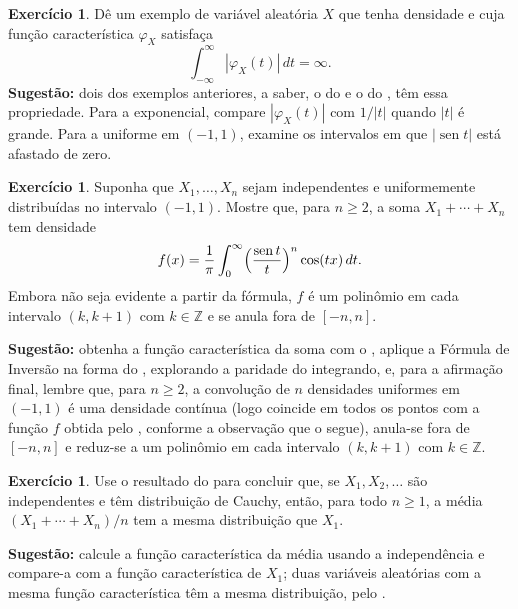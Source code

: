 \documentclass[12pt,portuguese]{article}
\theoremstyle{definition}
\theoremstyle{plainexercise}
\theoremstyle{starredexercise}
\newtheorem{starredexercise}[exercise]{Exercício}
\theoremstyle{definition}
\renewcommand{\sin}{\operatorname{sen}}
\begin{document}
\begin{starredexercise}\label{exercise:densidade-integral-divergente}
Dê um exemplo de variável aleatória $X$ que tenha densidade e cuja função
característica $\varphi_X$ satisfaça
\[
\int_{-\infty}^{\infty}|\varphi_X(t)|\,dt = \infty .
\]
\noindent\textbf{Sugestão:} dois dos exemplos anteriores, a saber, o do
 e o do , têm essa propriedade. Para a
exponencial, compare $|\varphi_X(t)|$ com $1/|t|$ quando $|t|$ é grande. Para a
uniforme em $(-1,1)$, examine os intervalos em que $|\sin t|$ está afastado de
zero.
\end{starredexercise}

\begin{starredexercise}\label{exercise:soma-uniformes}
Suponha que $X_1,\ldots,X_n$ sejam independentes e uniformemente distribuídas no
intervalo $(-1,1)$. Mostre que, para $n\geqslant 2$, a soma
$X_1+\cdots+X_n$ tem densidade
\[
f(x) = \frac{1}{\pi}\int_{0}^{\infty}\Bigl(\frac{\sin t}{t}\Bigr)^{n}
\cos(tx)\,dt .
\]
Embora não seja evidente a partir da fórmula, $f$ é um polinômio em cada
intervalo $(k,k+1)$ com $k\in\mathbb{Z}$ e se anula fora de $[-n,n]$.

\noindent\textbf{Sugestão:} obtenha a função característica da soma com o
, aplique a Fórmula de Inversão na forma do
, explorando a paridade do integrando, e, para
a afirmação final, lembre que, para $n\geqslant2$, a convolução de $n$
densidades uniformes em $(-1,1)$ é uma densidade contínua (logo coincide em
todos os pontos com a função $f$ obtida pelo ,
conforme a observação que o segue), anula-se fora de $[-n,n]$ e reduz-se a um
polinômio em cada intervalo $(k,k+1)$ com $k\in\mathbb{Z}$.
\end{starredexercise}

\begin{starredexercise}\label{exercise:cauchy-media}
Use o resultado do  para concluir que, se $X_1,X_2,\ldots$ são
independentes e têm distribuição de Cauchy, então, para todo $n\geqslant 1$, a
média $(X_1+\cdots+X_n)/n$ tem a mesma distribuição que $X_1$.

\noindent\textbf{Sugestão:} calcule a função característica da média usando a
independência e compare-a com a função característica de $X_1$; duas variáveis
aleatórias com a mesma função característica têm a mesma distribuição, pelo
.
\end{starredexercise}
\end{document}
